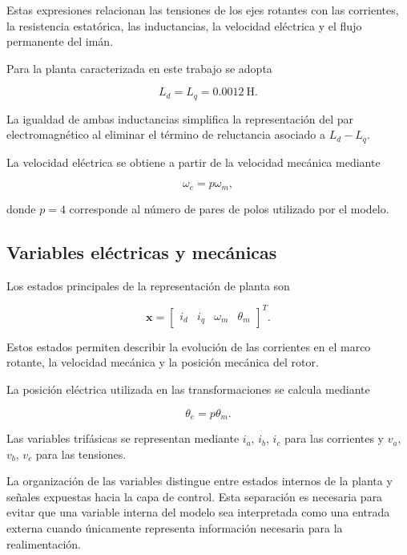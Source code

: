 Estas expresiones relacionan las tensiones de los ejes rotantes con las corrientes, la resistencia estatórica, las inductancias, la velocidad eléctrica y el flujo permanente del imán.

Para la planta caracterizada en este trabajo se adopta

\begin{equation}
L_d=L_q=0.0012~\mathrm{H}.
\end{equation}

La igualdad de ambas inductancias simplifica la representación del par electromagnético al eliminar el término de reluctancia asociado a $L_d-L_q$.

La velocidad eléctrica se obtiene a partir de la velocidad mecánica mediante

\begin{equation}
\omega_e=p\omega_m,
\end{equation}

donde $p=4$ corresponde al número de pares de polos utilizado por el modelo.

\subsection{Variables eléctricas y mecánicas}

Los estados principales de la representación de planta son

\begin{equation}
\mathbf{x}
=
\begin{bmatrix}
i_d &
i_q &
\omega_m &
\theta_m
\end{bmatrix}^{T}.
\end{equation}

Estos estados permiten describir la evolución de las corrientes en el marco rotante, la velocidad mecánica y la posición mecánica del rotor.

La posición eléctrica utilizada en las transformaciones se calcula mediante

\begin{equation}
\theta_e=p\theta_m.
\end{equation}

Las variables trifásicas se representan mediante $i_a$, $i_b$, $i_c$ para las corrientes y $v_a$, $v_b$, $v_c$ para las tensiones.

La organización de las variables distingue entre estados internos de la planta y señales expuestas hacia la capa de control. Esta separación es necesaria para evitar que una variable interna del modelo sea interpretada como una entrada externa cuando únicamente representa información necesaria para la realimentación.

